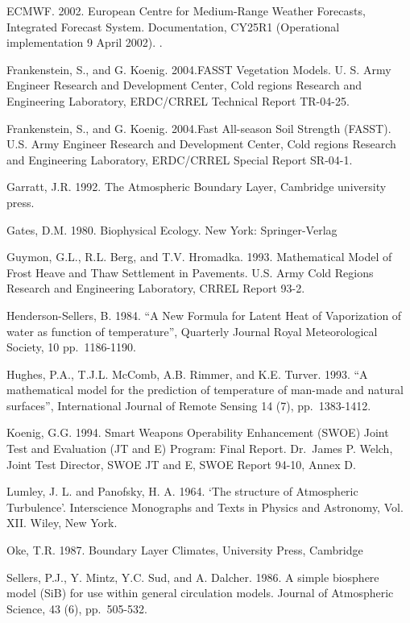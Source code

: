 ECMWF. 2002. European Centre for Medium-Range Weather Forecasts, Integrated Forecast System. Documentation, CY25R1 (Operational implementation 9 April 2002). .

Frankenstein, S., and G. Koenig. 2004.FASST Vegetation Models. U. S. Army Engineer Research and Development Center, Cold regions Research and Engineering Laboratory, ERDC/CRREL Technical Report TR-04-25.

Frankenstein, S., and G. Koenig. 2004.Fast All-season Soil Strength (FASST). U.S. Army Engineer Research and Development Center, Cold regions Research and Engineering Laboratory, ERDC/CRREL Special Report SR-04-1.

Garratt, J.R. 1992. The Atmospheric Boundary Layer, Cambridge university press.

Gates, D.M. 1980. Biophysical Ecology. New York: Springer-Verlag

Guymon, G.L., R.L. Berg, and T.V. Hromadka. 1993. Mathematical Model of Frost Heave and Thaw Settlement in Pavements. U.S. Army Cold Regions Research and Engineering Laboratory, CRREL Report 93-2.

Henderson-Sellers, B. 1984. ``A New Formula for Latent Heat of Vaporization of water as function of temperature'', Quarterly Journal Royal Meteorological Society, 10 pp.~1186-1190.

Hughes, P.A., T.J.L. McComb, A.B. Rimmer, and K.E. Turver. 1993. ``A mathematical model for the prediction of temperature of man-made and natural surfaces'', International Journal of Remote Sensing 14 (7), pp.~1383-1412.

Koenig, G.G. 1994. Smart Weapons Operability Enhancement (SWOE) Joint Test and Evaluation (JT and E) Program: Final Report. Dr.~James P. Welch, Joint Test Director, SWOE JT and E, SWOE Report 94-10, Annex D.

Lumley, J. L. and Panofsky, H. A. 1964. `The structure of Atmospheric Turbulence'. Interscience Monographs and Texts in Physics and Astronomy, Vol. XII. Wiley, New York.

Oke, T.R. 1987. Boundary Layer Climates, University Press, Cambridge

Sellers, P.J., Y. Mintz, Y.C. Sud, and A. Dalcher. 1986. A simple biosphere model (SiB) for use within general circulation models. Journal of Atmospheric Science, 43 (6), pp.~505-532.
